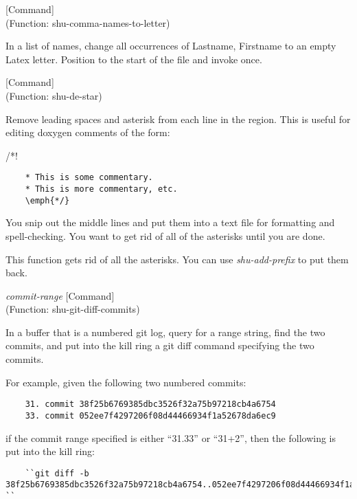\vspace{1em}
\noindent
{}
\usebox{\funcname}
 \hfill [Command]\\%
 (Function: shu-comma-names-to-letter)

\begin{doc-string}
In a list of names, change all occurrences
of Lastname, Firstname to an empty Latex letter.
Position to the start of the file and invoke once.
\end{doc-string}

\vspace{1em}
\noindent
{}
\usebox{\funcname}
 \hfill [Command]\\%
 (Function: shu-de-star)

\begin{doc-string}
Remove leading spaces and asterisk from each line in the region.  This is
useful for editing doxygen comments of the form:

   /*!
\small{\begin{verbatim}
    * This is some commentary.
    * This is more commentary, etc.
    \emph{*/}
\end{verbatim}}

You snip out the middle lines and put them into a text file for formatting and
spell-checking.  You want to get rid of all of the asterisks until you are
done.

This function gets rid of all the asterisks.  You can use \emph{shu-add-prefix} to
put them back.
\end{doc-string}

\vspace{1em}
\noindent
{}
\usebox{\funcname}\emph{commit-range}
 \hfill [Command]\\%
 (Function: shu-git-diff-commits)

\begin{doc-string}
In a buffer that is a numbered git log, query for a range string, find the two
commits, and put into the kill ring a git diff command specifying the two commits.

For example, given the following two numbered commits:

\small{\begin{verbatim}
    31. commit 38f25b6769385dbc3526f32a75b97218cb4a6754
    33. commit 052ee7f4297206f08d44466934f1a52678da6ec9
\end{verbatim}}

if the commit range specified is either ``31.33'' or ``31+2'', then the following
is put into the kill ring:

\small{\begin{verbatim}
    ``git diff -b 38f25b6769385dbc3526f32a75b97218cb4a6754..052ee7f4297206f08d44466934f1a52678da6ec9 ``
\end{verbatim}}
\end{doc-string}

